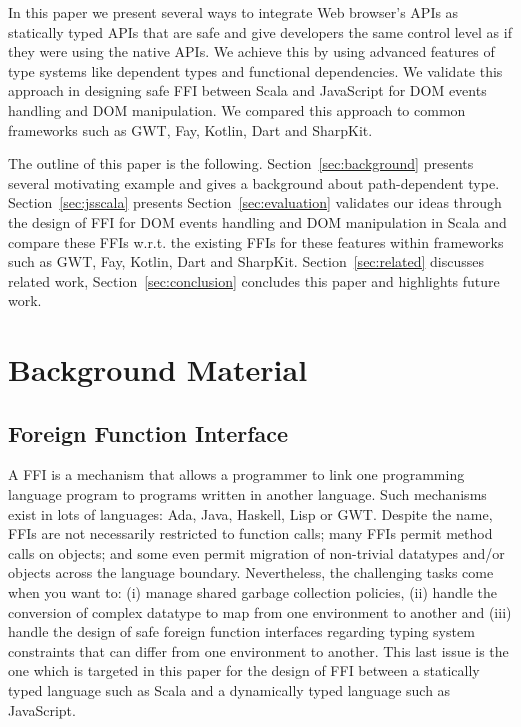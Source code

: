 \documentclass[runningheads,a4paper]{llncs}
\begin{document}
In this paper we present several ways to integrate Web browser’s APIs as statically typed APIs that are safe and
give developers the same control level as if they were using the native APIs. We achieve this by using advanced
features of type systems like dependent types and functional dependencies. We validate this approach in designing
safe FFI between Scala and JavaScript for DOM events handling and DOM manipulation. We compared this approach to
common frameworks such as GWT, Fay, Kotlin, Dart and SharpKit.


The outline of this paper is the following.
Section~\ref{sec:background} presents several motivating example and gives a background about path-dependent type.
Section~\ref{sec:jsscala} presents %
Section~\ref{sec:evaluation} validates our ideas through the design of FFI for DOM events handling and DOM
manipulation in Scala and compare these FFIs w.r.t. the existing FFIs for these features within frameworks such as
GWT, Fay, Kotlin, Dart and SharpKit.
Section~\ref{sec:related} discusses related work, Section~\ref{sec:conclusion} concludes this paper and highlights  future work. 


\section{Background Material}

\subsection{Foreign Function Interface}

A FFI is a mechanism that allows a programmer to link one programming language program to programs written in another
language. Such mechanisms exist in lots of languages: Ada, Java, Haskell, Lisp or GWT. Despite the name, FFIs are
not necessarily restricted to function calls; many FFIs permit method calls on objects; and some even permit
migration of non-trivial datatypes and/or objects across the language boundary. Nevertheless, the challenging tasks
come when you want to: (i) manage shared garbage collection policies, (ii) handle the conversion of complex
datatype to map from one environment to another and (iii) handle the design of safe foreign function interfaces
regarding typing system constraints that can differ from one environment to another. This last issue is the one which
is targeted in this paper for the design of FFI between a statically typed language such as Scala and a dynamically
typed language such as JavaScript.
\end{document}
